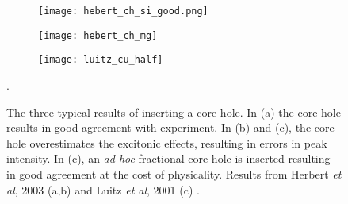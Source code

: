 \begin{figure}
	\begin{subfigure}{0.45\textwidth}
		\texttt{[image: hebert\_ch\_si\_good.png]} 
		\caption{}
		\label{hebert-ch-good}
	\end{subfigure}
    \hspace{-0.01cm}
	\begin{subfigure}{0.45\textwidth}
		\texttt{[image: hebert\_ch\_mg]} 
		\caption{}
		\label{hebert-ch-bad}
	\end{subfigure}
	\vspace{1cm}
	\begin{subfigure}{0.45\textwidth}
		\texttt{[image: luitz\_cu\_half]} 
		\caption{}
		\label{luitz_half}
	\end{subfigure}
	\centering
	\caption{The three typical results of inserting a core hole. In (a) the core hole results in good agreement with experiment.  In (b) and (c), the core hole overestimates the excitonic effects, resulting in errors in peak intensity.  In (c), an \textit{ad hoc} fractional core hole is inserted resulting in good agreement at the cost of physicality. Results from Herbert \textit{et al}, 2003  (a,b) and Luitz \textit{et al}, 2001 (c)\cite{luitz_partial_2001, hebert_improvement_2003} .}
	\label{core-hole-types}. 
	
\end{figure}

\newpage




